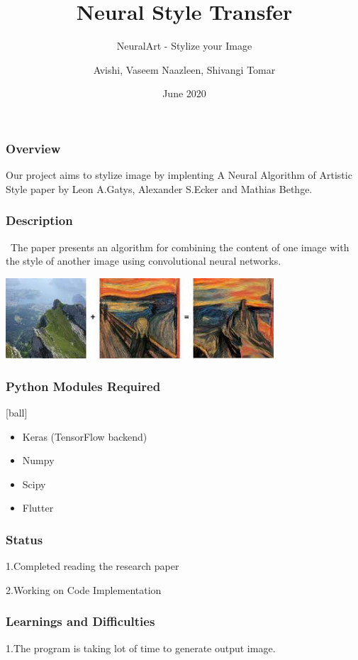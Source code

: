 \documentclass[14pt]{beamer}
\title[NST]{Neural Style Transfer}
\subtitle{NeuralArt - Stylize your Image}
\author[Team - 38]{Avishi, Vaseem Naazleen, Shivangi Tomar}
\date{June 2020}
\begin{document}
\begin{frame}
   \titlepage
\end{frame}

\begin{frame}
		\frametitle{Overview}
		Our project aims to stylize image by implenting A Neural Algorithm of Artistic Style paper by Leon A.Gatys, Alexander S.Ecker and Mathias Bethge.
\end{frame}

\begin{frame}
		\frametitle{Description}
		\ The paper presents an algorithm for combining the content of one image with the style of another image using convolutional neural networks.

		\includegraphics[width=100mm]{image.jpg}
\end{frame}

\begin{frame}
		\frametitle{Python Modules Required}
		\begin{itemize}
		\item Keras (TensorFlow backend)
	    \item Numpy
	    \item Scipy
		\item Flutter
		\end{itemize}
\end{frame}

\begin{frame}
		\frametitle{Status}
        \item 1.Completed reading the research paper
	    \item 2.Working on Code Implementation
\end{frame}

\begin{frame}
		\frametitle{Learnings and Difficulties}
        \item 1.The program is taking lot of time to generate output image.
\end{frame}
\end{document}
